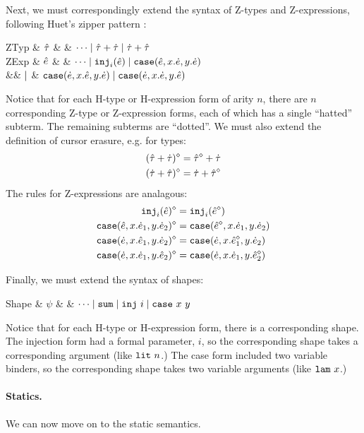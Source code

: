 Next, we must correspondingly extend the syntax of Z-types and
Z-expressions, following Huet's zipper pattern \cite{JFP::Huet1997}:
\begin{grammar}
\textsf{ZTyp} & $\hat{\tau}$ & \bnfas & $\cdots \mathrel{\mid} {\hat{\tau}} + {\dot{\tau}} \mathrel{\mid} {\dot{\tau}} + {\hat{\tau}}$
\\
\textsf{ZExp} & $\hat{e}$ & \bnfas & $\cdots
\mathrel{\mid} \texttt{inj}_{i}({\hat{e}})
\mathrel{\mid} \texttt{case}({\hat{e}},{x}.{\dot{e}},{y}.{\dot{e}})$
\\
&& $\mathrel{\mid}$ & $\texttt{case}({\dot{e}},{x}.{\hat{e}},{y}.{\dot{e}})
\mathrel{\mid}\texttt{case}({\dot{e}},{x}.{\dot{e}},{y}.{\hat{e}})$
\end{grammar}
Notice that for each H-type or H-expression form of arity $n$, there are
$n$ corresponding Z-type or Z-expression forms, each of which has a single
``hatted'' subterm. The remaining subterms are ``dotted''. We must also
extend the definition of cursor erasure, e.g. for types:
\begin{align*}
(\hat{\tau} + \dot{\tau})^{\diamond} & = \hat{\tau}^{\diamond} + \dot{\tau}\\
(\dot{\tau} + \hat{\tau})^{\diamond} & = \dot{\tau} + \hat{\tau}^{\diamond}
\end{align*}
The rules for Z-expressions are analagous:
\begin{align*}
\texttt{inj}_{i}({\hat{e}})^{\diamond} & = \texttt{inj}_{i}({\hat{e}^{\diamond}})\\
\texttt{case}({\hat{e}},{x}.{\dot{e}_1},{y}.{\dot{e}_2})^{\diamond} & = \texttt{case}({\hat{e}^{\diamond}},{x}.{\dot{e}_1},{y}.{\dot{e}_2})\\
\texttt{case}({\dot{e}},{x}.{\hat{e}_1},{y}.{\dot{e}_2})^{\diamond} & = \texttt{case}({\dot{e}},{x}.{\hat{e}_1^{\diamond}},{y}.{\dot{e}_2})\\
\texttt{case}({\dot{e}},{x}.{\dot{e}_1},{y}.{\hat{e}_2})^{\diamond} & = \texttt{case}({\dot{e}},{x}.{\dot{e}_1},{y}.{\hat{e}_2^{\diamond}})
\end{align*}

Finally, we must extend the syntax of shapes:
\begin{grammar}
\textsf{Shape} & $\psi$ & \bnfas & $\cdots \mathrel{\mid} \mathtt{sum} \mathrel{\mid} \mathtt{inj}~i \mathrel{\mid} \mathtt{case}~x~y$
\end{grammar}
Notice that for each H-type or H-expression form, there is a corresponding
shape. The injection form had a formal parameter, $i$, so the corresponding
shape takes a corresponding argument (like $\mathtt{lit}~n$.) The case form
included two variable binders, so the corresponding shape takes two
variable arguments (like $\mathtt{lam}~x$.)



\paragraph{Statics.}
We can now move on to the static semantics.

